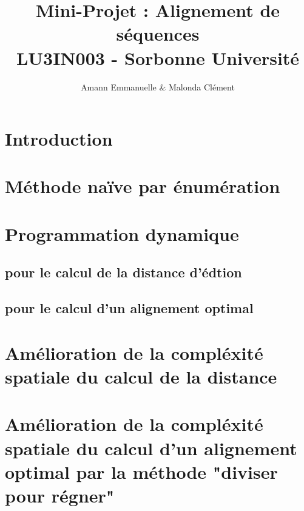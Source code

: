 \documentclass[12pt]{article}
\begin{document}
\title{Mini-Projet : Alignement de séquences \\ LU3IN003 - Sorbonne Université}
\author{Amann Emmanuelle \& Malonda Clément}
\maketitle
\tableofcontents
\newpage

\section{Introduction}

\section{Méthode naïve par énumération}

\newpage
\section{Programmation dynamique}
\subsection{pour le calcul de la distance d'édtion}

\subsection{pour le calcul d'un alignement optimal}

\newpage
\section{Amélioration de la compléxité spatiale du calcul de la distance}

\newpage
\section{Amélioration de la compléxité spatiale du calcul d'un alignement optimal par la méthode "diviser pour régner"}

\end{document}
